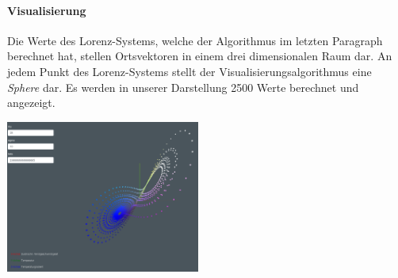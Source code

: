 \documentclass[implementation]{subfiles}
\begin{document}
	\paragraph{Visualisierung}
	Die Werte des Lorenz-Systems, welche der Algorithmus im letzten Paragraph berechnet hat, stellen Ortsvektoren in einem drei dimensionalen Raum dar. An jedem Punkt des Lorenz-Systems stellt der Visualisierungsalgorithmus eine \textit{Sphere} dar. Es werden in unserer Darstellung 2500 Werte berechnet und angezeigt.
	
	\begin{centerFigure}
		\includegraphics[height=5cm]{lorenz/assets/implementation/Visualisierung}
	\end{centerFigure}
\end{document}
